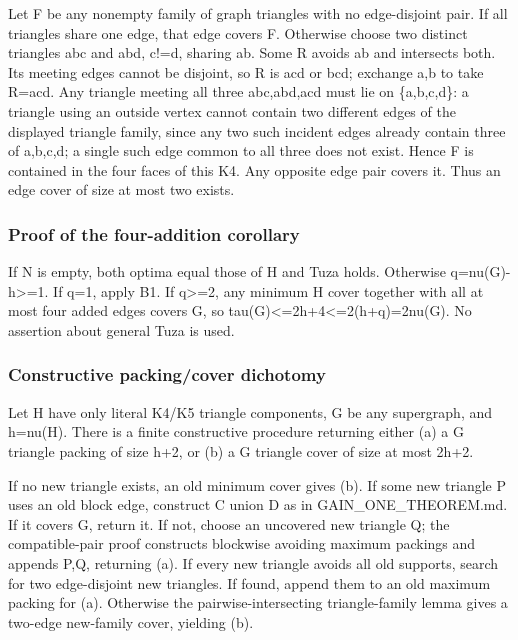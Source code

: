 \documentclass[11pt]{article}
\begin{document}
Let F be any nonempty family of graph triangles with no edge-disjoint pair. If all triangles share one edge, that edge covers F. Otherwise choose two distinct triangles abc and abd, c!=d, sharing ab. Some R avoids ab and intersects both. Its meeting edges cannot be disjoint, so R is acd or bcd; exchange a,b to take R=acd. Any triangle meeting all three abc,abd,acd must lie on \{a,b,c,d\}: a triangle using an outside vertex cannot contain two different edges of the displayed triangle family, since any two such incident edges already contain three of a,b,c,d; a single such edge common to all three does not exist. Hence F is contained in the four faces of this K4. Any opposite edge pair covers it. Thus an edge cover of size at most two exists.

\subsubsection{Proof of the four-addition corollary}\label{proof-of-the-four-addition-corollary}

If N is empty, both optima equal those of H and Tuza holds. Otherwise q=nu(G)-h\textgreater=1. If q=1, apply B1. If q\textgreater=2, any minimum H cover together with all at most four added edges covers G, so tau(G)\textless=2h+4\textless=2(h+q)=2nu(G). No assertion about general Tuza is used.

\subsubsection{Constructive packing/cover dichotomy}\label{constructive-packingcover-dichotomy}

Let H have only literal K4/K5 triangle components, G be any supergraph, and h=nu(H). There is a finite constructive procedure returning either (a) a G triangle packing of size h+2, or (b) a G triangle cover of size at most 2h+2.

If no new triangle exists, an old minimum cover gives (b). If some new triangle P uses an old block edge, construct C union D as in GAIN\_ONE\_THEOREM.md. If it covers G, return it. If not, choose an uncovered new triangle Q; the compatible-pair proof constructs blockwise avoiding maximum packings and appends P,Q, returning (a). If every new triangle avoids all old supports, search for two edge-disjoint new triangles. If found, append them to an old maximum packing for (a). Otherwise the pairwise-intersecting triangle-family lemma gives a two-edge new-family cover, yielding (b).
\end{document}
